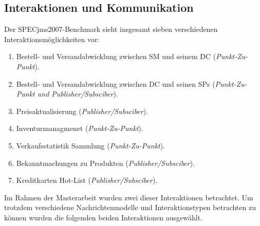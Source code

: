\subsection{Interaktionen und Kommunikation}
Der SPECjms2007-Benchmark sieht insgesamt sieben verschiedenen Interaktionsmöglichkeiten vor: 
\begin{enumerate}
    \item Bestell- und Versandabwicklung zwischen SM und seinem DC (\emph{Punkt-Zu-Punkt}).
    \item Bestell- und Versandabwicklung zwischen DC und seinen SPs (\emph{Punkt-Zu-Punkt und Publisher/Subsciber}).
    \item Preisaktualisierung (\emph{Publisher/Subsciber}).
    \item Inventurmanagmenet (\emph{Punkt-Zu-Punkt}).
    \item Verkaufsstatistik Sammlung (\emph{Punkt-Zu-Punkt}).
    \item Bekanntmachungen zu Produkten (\emph{Publisher/Subsciber}).
    \item Kreditkarten Hot-List (\emph{Publisher/Subsciber}).
    
\end{enumerate}
Im Rahmen der Masterarbeit wurden zwei dieser Interaktionen betrachtet. Um trotzdem verschiedene Nachrichtenmodelle und Interaktionstypen betrachten zu können wurden die folgenden beiden Interaktionen ausgewählt.
